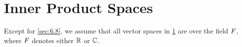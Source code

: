 \chapter{Inner Product Spaces}\label{ch:6}

\begin{note}
  Except for \cref{sec:6.8}, we assume that all vector spaces in \cref{ch:6} are over the field \(\mathit{F}\), where \(\mathit{F}\) denotes either \(\mathbb{R}\) or \(\mathbb{C}\).
\end{note}












